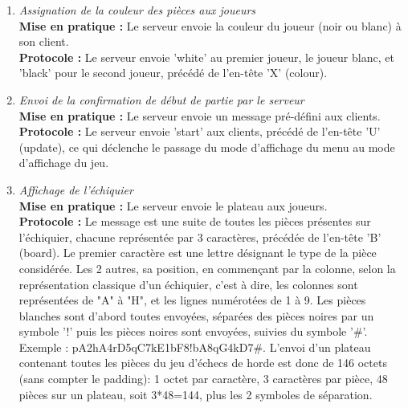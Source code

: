 \documentclass[10pt, a4paper]{article}
\begin{document}
\begin{enumerate}
\item \textit{Assignation de la couleur des pièces aux joueurs} \\
\textbf{Mise en pratique :} Le serveur envoie la couleur du joueur (noir ou blanc) à son client. \\
\textbf{Protocole :} Le serveur envoie 'white' au premier joueur, le joueur blanc, et 'black' pour le second joueur, précédé de l'en-tête 'X' (colour).


\item \textit{Envoi de la confirmation de début de partie par le serveur}\\
\textbf{Mise en pratique :} Le serveur envoie un message pré-défini aux clients.\\
\textbf{Protocole :} Le serveur envoie 'start' aux clients, précédé de l'en-tête 'U' (update), ce qui déclenche le passage du mode d'affichage du menu au mode d'affichage du jeu.

\newpage

\item \textit{Affichage de l'échiquier} \\
\textbf{Mise en pratique :} Le serveur envoie le plateau aux joueurs. \\
\textbf{Protocole :} Le message est une suite de toutes les pièces présentes sur l'échiquier, chacune représentée par 3 caractères, précédée de l'en-tête 'B' (board). Le premier caractère est une lettre désignant le type de la pièce considérée. Les 2 autres, sa position, en commençant par la colonne, selon la représentation classique d'un échiquier, c'est à dire, les colonnes sont représentées de "A" à "H", et les lignes numérotées de 1 à 9. Les pièces blanches sont d'abord toutes envoyées, séparées des pièces noires par un symbole '!' puis les pièces noires sont envoyées, suivies du symbole '\#'. Exemple : pA2hA4rD5qC7kE1bF8!bA8qG4kD7\#. L'envoi d'un plateau contenant toutes les pièces du jeu d'échecs de horde est donc de 146 octets (sans compter le padding): 1 octet par caractère, 3 caractères par pièce, 48 pièces sur un plateau, soit 3*48=144, plus les 2 symboles de séparation.
\label{send_board}


\end{enumerate}
\end{document}
